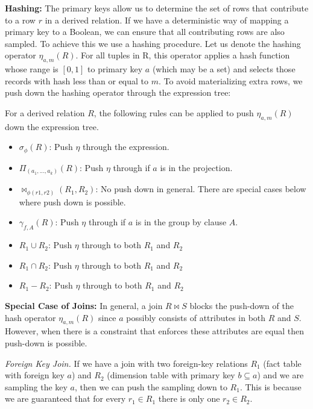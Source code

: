 \noindent\textbf{Hashing: } The primary keys allow us to determine the set of rows that contribute to a row $r$ in a derived relation.
If we have a deterministic way of mapping a primary key to a Boolean, we can ensure that all contributing rows are also sampled. 
To achieve this we use a hashing procedure.
Let us denote the hashing operator $\eta_{a, m}(R)$. 
For all tuples in R, this operator applies a hash function whose range is $[0,1]$ to primary key $a$ (which may be a set) and selects those records with hash less than or equal to $m$.
To avoid materializing extra rows, we push down the hashing operator through the expression tree:
\begin{definition}
For a derived relation $R$, the following rules can be applied to push $\eta_{a, m}(R)$ down the expression tree. 
\begin{itemize}[noitemsep]
\item $\sigma_{\phi}(R)$: Push $\eta$ through the expression.  
\item $\Pi_{(a_1,...,a_k)}(R)$: Push $\eta $ through if $a$ is in the projection.
\item $\bowtie_{\phi (r1,r2)}(R_1,R_2)$: No push down in general. There are special cases below where push down is possible.
\item $\gamma_{f,A}(R)$: Push $\eta $ through if $a$ is in the group by clause $A$.
\item $R_1 \cup R_2$: Push $\eta $ through to both $R_1$ and $R_2$
\item $R_1 \cap R_2$: Push $\eta $ through to both $R_1$ and $R_2$
\item $R_1 - R_2$: Push $\eta $ through to both $R_1$ and $R_2$
\end{itemize}
\end{definition}

\noindent \textbf{Special Case of Joins: }
In general, a join $R \bowtie S$ blocks the push-down of the hash operator $\eta_{a, m}(R)$ since $a$ possibly consists of attributes in both $R$ and $S$.
However, when there is a constraint that enforces these attributes are equal then push-down is possible.

\emph{Foreign Key Join. } If we have a join with two foreign-key relations $R_1$ (fact table with foreign key $a$) and $R_2$ (dimension table with primary key $b \subseteq a$) and we are sampling the key $a$, then we can push the sampling down to $R_1$. This is because we are guaranteed that for every $r_1\in R_1$ there is only one $r_2 \in R_2$. 

